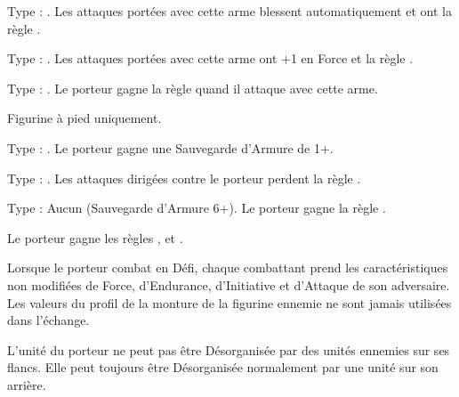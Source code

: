 Type : \hw{}. Les attaques portées avec cette arme blessent automatiquement et ont la règle .

Type : \hw{}. Les attaques portées avec cette arme ont +1 en Force et la règle \lightningreflexes{}.

Type : \gw{}. Le porteur gagne la règle \crushattack{} quand il attaque avec cette arme.

\endpricelist

\armymagicalarmour

\startpricelist

Figurine à pied uniquement.

Type : \platearmour{}. Le porteur gagne une Sauvegarde d'Armure de 1+.

Type : \platearmour{}. Les attaques dirigées contre le porteur perdent la règle .

Type : Aucun (Sauvegarde d'Armure 
6+). Le porteur gagne la règle \fear{}.

\endpricelist

\armytalismans

\startpricelist

Le porteur gagne les règles \distracting{}, \fireborn{} et .

\endpricelist

\armyenchanteditems

\startpricelist

Lorsque le porteur combat en Défi, chaque combattant prend les caractéristiques non modifiées de Force, d'Endurance, d'Initiative et d'Attaque de son adversaire. Les valeurs du profil de la monture de la figurine ennemie ne sont jamais utilisées dans l'échange.

\endpricelist

\armymagicalbanners

\startpricelist

L'unité du porteur ne peut pas être Désorganisée par des unités ennemies sur ses flancs. Elle peut toujours être Désorganisée normalement par une unité sur son arrière.

